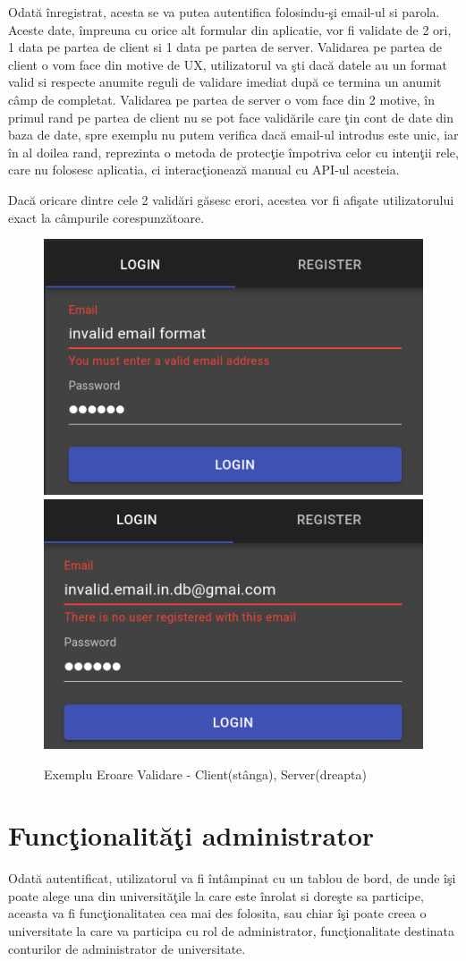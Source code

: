 \documentclass[12pt, a4paper, oneside, romanian]{teza-upb}
\begin{document}
Odată înregistrat, acesta se va putea autentifica folosindu-şi email-ul si parola.\\

Aceste date, împreuna cu orice alt formular din aplicatie, vor fi validate de 2 ori, 1 data pe partea de client si 1 data pe partea de server. Validarea pe partea de client o vom face din motive de UX, utilizatorul va şti dacă datele au un format valid si respecte anumite reguli de validare imediat după ce termina un anumit câmp de completat. Validarea pe partea de server o vom face din 2 motive, în primul rand pe partea de client nu se pot face validările care ţin cont de date din baza de date, spre exemplu nu putem verifica dacă email-ul introdus este unic, iar în al doilea rand, reprezinta o metoda de protecţie împotriva celor cu intenţii rele, care nu folosesc aplicatia, ci interacţionează manual cu API-ul acesteia.

Dacă oricare dintre cele 2 validări găsesc erori, acestea vor fi afişate utilizatorului exact la câmpurile corespunzătoare.

\begin{figure}[H]
\centering
\includegraphics*[width=0.45\columnwidth]{exemplu-eroare-validare-frontend}
\includegraphics*[width=0.45\columnwidth]{exemplu-eroare-validare-backend}
\caption{Exemplu Eroare Validare - Client(stânga), Server(dreapta)}
\label{exemplu-eroare-validare}
\end{figure}

\section{Funcţionalităţi administrator}

Odată autentificat, utilizatorul va fi întâmpinat cu un tablou de bord, de unde îşi poate alege una din universităţile la care este înrolat si doreşte sa participe, aceasta va fi funcţionalitatea cea mai des folosita, sau chiar îşi poate creea o universitate la care va participa cu rol de administrator, funcţionalitate destinata conturilor de administrator de universitate.
\end{document}
